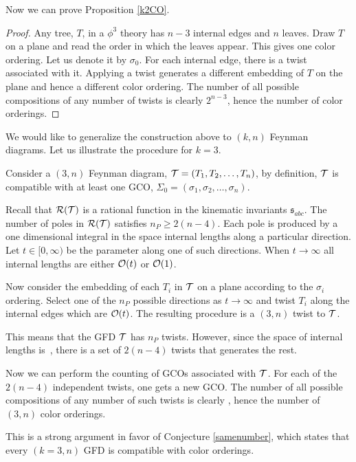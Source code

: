 \documentclass[pdftex]{sigma}
\def \s {\sigma}
\theoremstyle{definition}
\def \s {\mathfrak{s}}
\numberwithin{equation}{section}
\begin{document}
Now we can prove Proposition \ref{k2CO}.

\begin{proof}
Any tree, $T$, in a $\phi^3$ theory has $n-3$ internal edges and $n$ leaves. Draw $T$ on a plane and read the order in which the leaves appear. This gives one color ordering. Let us denote it by $\sigma_0$. For each internal edge, there is a twist associated with it. Applying a twist generates a different embedding of $T$ on the plane and hence a different color ordering. The number of all possible compositions of any number of twists is clearly $2^{n-3}$, hence the number of color orderings.
\end{proof}

We would like to generalize the construction above to $(k,n)$ Feynman diagrams. Let us illustrate the procedure for $k=3$.

Consider a $(3,n)$ Feynman diagram, ${\cal T}=(T_1,T_2,\dots ,T_n)$, by definition, ${\cal T}$ is compatible with at least one GCO, $\Sigma_0=(\sigma_1,\sigma_2, \dots ,\sigma_n)$.

Recall that ${\cal R}({\cal T})$ is a rational function in the kinematic invariants $\s_{abc}$. The number of poles in ${\cal R}({\cal T})$ satisfies $n_P\geq 2(n-4)$. Each pole is produced by a one dimensional integral in the space internal lengths along a particular direction. Let $t\in [0,\infty)$ be the parameter along one of such directions. When $t\to \infty$ all internal lengths are either ${\cal O}(t)$ or ${\cal O}(1)$.

Now consider the embedding of each $T_i$ in ${\cal T}$ on a plane according to the $\sigma_i$ ordering. Select one of the $n_P$ possible directions as $t\to \infty$ and twist $T_i$ along the internal edges which are ${\cal O}(t)$. The resulting procedure is a $(3,n)$ twist to ${\cal T}$.

This means that the GFD ${\cal T}$ has $n_P$ twists. However, since the space of internal lengths is~, there is a set of $2(n-4)$ twists that generates the rest.

Now we can perform the counting of GCOs associated with ${\cal T}$. For each of the $2(n-4)$ independent twists, one gets a new GCO. The number of all possible compositions of any number of such twists is clearly , hence the number of $(3,n)$ color orderings.

This is a strong argument in favor of Conjecture \ref{samenumber}, which states that every $(k=3,n)$ GFD is compatible with  color orderings.
\end{document}
